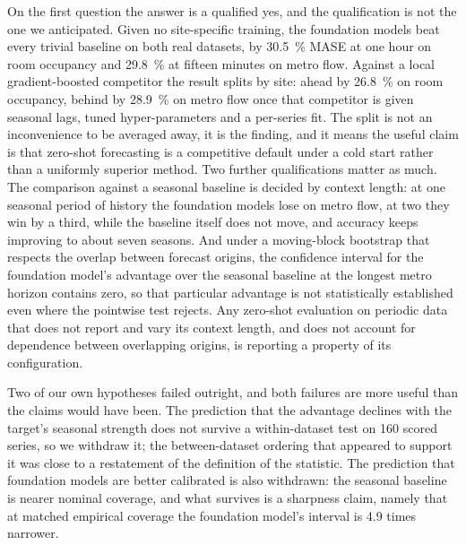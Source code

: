\documentclass[11pt]{article}
\theoremstyle{plain}
\theoremstyle{definition}
\theoremstyle{remark}
\newif\ifrevisionmarkup
\newcommand{\new}[1]{\ifrevisionmarkup\textcolor{revision}{#1}\else#1\fi}
\begin{document}
\new{On the first question the answer is a qualified yes, and the qualification is not the one we anticipated. Given no site-specific training, the foundation models beat every trivial baseline on both real datasets, by \SI{30.5}{\percent} MASE at one hour on room occupancy and \SI{29.8}{\percent} at fifteen minutes on metro flow. Against a local gradient-boosted competitor the result splits by site: ahead by \SI{26.8}{\percent} on room occupancy, behind by \SI{28.9}{\percent} on metro flow once that competitor is given seasonal lags, tuned hyper-parameters and a per-series fit. The split is not an inconvenience to be averaged away, it is the finding, and it means the useful claim is that zero-shot forecasting is a competitive default under a cold start rather than a uniformly superior method. Two further qualifications matter as much. The comparison against a seasonal baseline is decided by context length: at one seasonal period of history the foundation models lose on metro flow, at two they win by a third, while the baseline itself does not move, and accuracy keeps improving to about seven seasons. And under a moving-block bootstrap that respects the overlap between forecast origins, the confidence interval for the foundation model's advantage over the seasonal baseline at the longest metro horizon contains zero, so that particular advantage is not statistically established even where the pointwise test rejects. Any zero-shot evaluation on periodic data that does not report and vary its context length, and does not account for dependence between overlapping origins, is reporting a property of its configuration.}

\new{Two of our own hypotheses failed outright, and both failures are more useful than the claims would have been.} The prediction that the advantage declines with the target's seasonal strength does not survive a within-dataset test on \num{160} \new{scored} series, so we withdraw it; the between-dataset ordering that appeared to support it was close to a restatement of the definition of the statistic. \new{The prediction that foundation models are better calibrated is also withdrawn: the seasonal baseline is nearer nominal coverage, and what survives is a sharpness claim, namely that at matched empirical coverage the foundation model's interval is \num{4.9} times narrower.}
\end{document}
